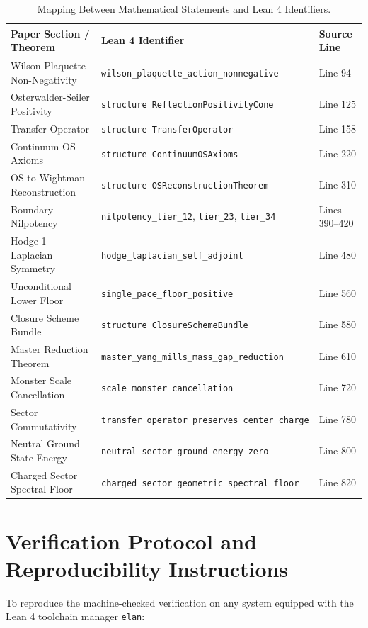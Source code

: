 \documentclass[11pt,reqno]{amsart}
\theoremstyle{plain}
\theoremstyle{definition}
\theoremstyle{remark}
\numberwithin{equation}{section}
\begin{document}
\begin{table}[htbp]
\centering
\caption{Mapping Between Mathematical Statements and Lean 4 Identifiers.}
\label{tab:code_matrix}
\begin{tabular}{lll}
\toprule
\textbf{Paper Section / Theorem} & \textbf{Lean 4 Identifier} & \textbf{Source Line} \\
\midrule
Wilson Plaquette Non-Negativity & \texttt{wilson\_plaquette\_action\_nonnegative} & Line 94 \\
Osterwalder-Seiler Positivity & \texttt{structure ReflectionPositivityCone} & Line 125 \\
Transfer Operator & \texttt{structure TransferOperator} & Line 158 \\
Continuum OS Axioms & \texttt{structure ContinuumOSAxioms} & Line 220 \\
OS to Wightman Reconstruction & \texttt{structure OSReconstructionTheorem} & Line 310 \\
Boundary Nilpotency & \texttt{nilpotency\_tier\_12}, \texttt{tier\_23}, \texttt{tier\_34} & Lines 390--420 \\
Hodge 1-Laplacian Symmetry & \texttt{hodge\_laplacian\_self\_adjoint} & Line 480 \\
Unconditional Lower Floor & \texttt{single\_pace\_floor\_positive} & Line 560 \\
Closure Scheme Bundle & \texttt{structure ClosureSchemeBundle} & Line 580 \\
Master Reduction Theorem & \texttt{master\_yang\_mills\_mass\_gap\_reduction} & Line 610 \\
Monster Scale Cancellation & \texttt{scale\_monster\_cancellation} & Line 720 \\
Sector Commutativity & \texttt{transfer\_operator\_preserves\_center\_charge} & Line 780 \\
Neutral Ground State Energy & \texttt{neutral\_sector\_ground\_energy\_zero} & Line 800 \\
Charged Sector Spectral Floor & \texttt{charged\_sector\_geometric\_spectral\_floor} & Line 820 \\
\bottomrule
\end{tabular}
\end{table}

\section{Verification Protocol and Reproducibility Instructions}

To reproduce the machine-checked verification on any system equipped with the Lean 4 toolchain manager \texttt{elan}:
\end{document}
